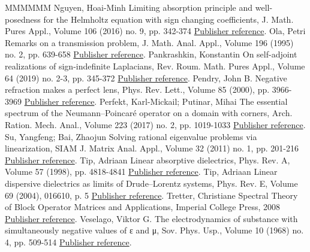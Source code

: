\begin{thebibliography}{MMMMMM}
 Nguyen, Hoai-Minh Limiting absorption principle and well-posedness for the Helmholtz equation with sign changing coefficients, J. Math. Pures Appl., Volume 106 (2016) no. 9, pp. 342-374 \href{https://ahl.centre-mersenne.org/item/AHL_2020__3__1161_0/#Ngu-16}{Publisher reference}.
 Ola, Petri Remarks on a transmission problem, J. Math. Anal. Appl., Volume 196 (1995) no. 2, pp. 639-658 \href{https://ahl.centre-mersenne.org/item/AHL_2020__3__1161_0/#Ola-95}{Publisher reference}.
 Pankrashkin, Konstantin On self-adjoint realizations of sign-indefinite Laplacians, Rev. Roum. Math. Pures Appl., Volume 64 (2019) no. 2-3, pp. 345-372 \href{https://ahl.centre-mersenne.org/item/AHL_2020__3__1161_0/#Pan}{Publisher reference}.
 Pendry, John B. Negative refraction makes a perfect lens, Phys. Rev. Lett., Volume 85 (2000), pp. 3966-3969 \href{https://ahl.centre-mersenne.org/item/AHL_2020__3__1161_0/#Pen-00}{Publisher reference}.
 Perfekt, Karl-Mickail; Putinar, Mihai The essential spectrum of the Neumann–Poincaré operator on a domain with corners, Arch. Ration. Mech. Anal., Volume 223 (2017) no. 2, pp. 1019-1033 \href{https://ahl.centre-mersenne.org/item/AHL_2020__3__1161_0/#Per-Put-17}{Publisher reference}.
 Su, Yangfeng; Bai, Zhaojun Solving rational eigenvalue problems via linearization, SIAM J. Matrix Anal. Appl., Volume 32 (2011) no. 1, pp. 201-216 \href{https://ahl.centre-mersenne.org/item/AHL_2020__3__1161_0/#Su-Bai-11}{Publisher reference}.
 Tip, Adriaan Linear absorptive dielectrics, Phys. Rev. A, Volume 57 (1998), pp. 4818-4841 \href{https://ahl.centre-mersenne.org/item/AHL_2020__3__1161_0/#Tip-98}{Publisher reference}.
 Tip, Adriaan Linear dispersive dielectrics as limits of Drude–Lorentz systems, Phys. Rev. E, Volume 69 (2004), 016610, p. 5 \href{https://ahl.centre-mersenne.org/item/AHL_2020__3__1161_0/#Tip-04}{Publisher reference}.
 Tretter, Christiane Spectral Theory of Block Operator Matrices and Applications, Imperial College Press, 2008 \href{https://ahl.centre-mersenne.org/item/AHL_2020__3__1161_0/#Tre-08}{Publisher reference}.
 Veselago, Viktor G. The electrodynamics of substance with simultaneously negative values of ε and μ, Sov. Phys. Usp., Volume 10 (1968) no. 4, pp. 509-514 \href{https://ahl.centre-mersenne.org/item/AHL_2020__3__1161_0/#Ves-68}{Publisher reference}.
\end{thebibliography}
